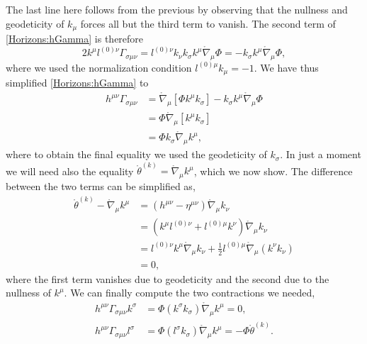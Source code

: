 The last line here follows from the previous by observing that the nullness and geodeticity of $k_\mu$ forces all
but the third term to vanish. The second term of \eqref{Horizons:hGamma} is therefore
\begin{equation}
    2 k^\mu l^{(0) \nu} \Gamma_{\sigma \mu \nu} = l^{(0) \nu}  k_\nu k_\sigma k^\mu \mathring{\nabla}_\mu \Phi = - k_\sigma k^\mu \mathring{\nabla}_\mu \Phi,
\end{equation}
where we used the normalization condition $l^{(0)\mu} k_\mu = -1$. We have thus simplified \eqref{Horizons:hGamma} to
\begin{equation}
    \begin{split}
        h^{\mu \nu} \Gamma_{\sigma \mu \nu}
        &= \mathring{\nabla}_\mu \left[ \Phi k^\mu k_\sigma \right] - k_\sigma k^\mu \mathring{\nabla}_\mu \Phi \\
        &= \Phi \mathring{\nabla}_\mu \left[ k^\mu k_\sigma \right] \\
        &= \Phi k_\sigma \mathring{\nabla}_\mu k^\mu,
    \end{split}
\end{equation}
where to obtain the final equality we used the geodeticity of $k_\sigma$. In just a moment we will need also the equality $\mathring{\theta}^{(k)} = \mathring{\nabla}_\mu k^\mu$, which we now show. The difference between the two terms can be simplified as,
\begin{equation}
    \begin{split}
        \mathring{\theta}^{(k)} - \mathring{\nabla}_\mu k^\mu
        &= \left( h^{\mu \nu} - \eta^{\mu \nu} \right) \mathring{\nabla}_\mu k_\nu \\
        &= \left(k^\mu l^{(0)\nu} + l^{(0)\mu} k^\nu \right) \mathring{\nabla}_\mu k_\nu \\
        &= l^{(0) \nu} k^\mu \mathring{\nabla}_\mu k_\nu + \frac{1}{2} l^{(0) \mu} \mathring{\nabla}_\mu \left(k^\nu k_\nu \right) \\
        &= 0,
    \end{split}
\end{equation}
where the first term vanishes due to geodeticity and the second due to the nullness of $k^\mu$. We can finally compute the two contractions we needed,
\begin{align}
    h^{\mu \nu} \Gamma_{\sigma \mu \nu} k^\sigma &= \Phi \left(k^\sigma k_\sigma\right) \mathring{\nabla}_\mu k^\mu = 0, \label{Horizons:hGammaK} \\
    h^{\mu \nu} \Gamma_{\sigma \mu \nu} l^\sigma &= \Phi \left(l^\sigma k_\sigma\right) \mathring{\nabla}_\mu k^\mu = -\Phi \mathring{\theta}^{(k)}. \label{Horizons:hGammaL}
\end{align}

